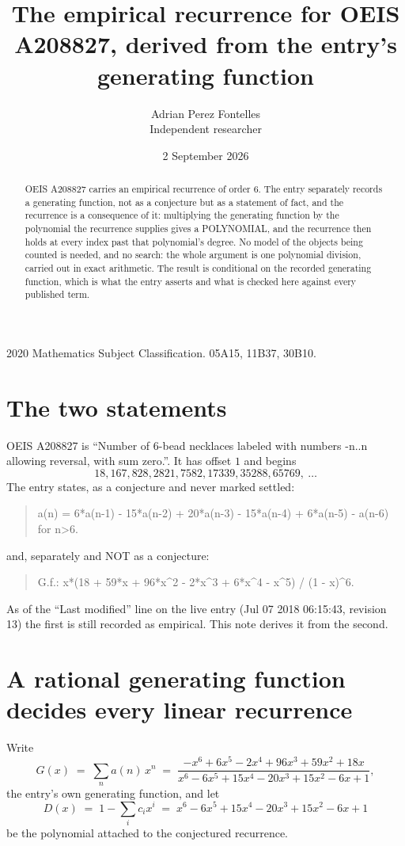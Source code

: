 \documentclass[11pt,a4paper]{article}
\title{The empirical recurrence for OEIS A208827, derived from the entry's generating function}
\author{Adrian Perez Fontelles\\ \small Independent researcher}
\date{2 September 2026}
\theoremstyle{plain}
\theoremstyle{definition}
\begin{document}
\maketitle

\begin{abstract}
OEIS A208827 carries an empirical recurrence of order $6$. The entry separately records a
generating function, not as a conjecture but as a statement of fact, and the recurrence is a
consequence of it: multiplying the generating function by the polynomial the recurrence
supplies gives a POLYNOMIAL, and the recurrence then holds at every index past that
polynomial's degree. No model of the objects being counted is needed, and no search: the
whole argument is one polynomial division, carried out in exact arithmetic. The result is
conditional on the recorded generating function, which is what the entry asserts and what is
checked here against every published term.
\end{abstract}

\noindent\small 2020 Mathematics Subject Classification. 05A15, 11B37, 30B10.\normalsize

\section{The two statements}

OEIS A208827 is ``Number of 6-bead necklaces labeled with numbers -n..n allowing reversal, with sum zero.''. It has offset $1$ and begins
\[
18, 167, 828, 2821, 7582, 17339, 35288, 65769,\ \dots
\]
The entry states, as a conjecture and never marked settled:
\begin{quote}
a(n) = 6*a(n-1) - 15*a(n-2) + 20*a(n-3) - 15*a(n-4) + 6*a(n-5) - a(n-6) for n>6.
\end{quote}
and, separately and NOT as a conjecture:
\begin{quote}
G.f.: x*(18 + 59*x + 96*x\^{}2 - 2*x\^{}3 + 6*x\^{}4 - x\^{}5) / (1 - x)\^{}6.
\end{quote}
As of the ``Last modified'' line on the live entry (Jul 07 2018 06:15:43, revision 13) the first is still
recorded as empirical. This note derives it from the second.

\section{A rational generating function decides every linear recurrence}

Write
\[
G(x)\;=\;\sum_{n}a(n)\,x^{n}\;=\;\frac{- x^{6} + 6 x^{5} - 2 x^{4} + 96 x^{3} + 59 x^{2} + 18 x}{x^{6} - 6 x^{5} + 15 x^{4} - 20 x^{3} + 15 x^{2} - 6 x + 1},
\]
the entry's own generating function, and let
\[
D(x)\;=\;1-\sum_i c_i x^{i}\;=\;x^{6} - 6 x^{5} + 15 x^{4} - 20 x^{3} + 15 x^{2} - 6 x + 1
\]
be the polynomial attached to the conjectured recurrence.
\end{document}
